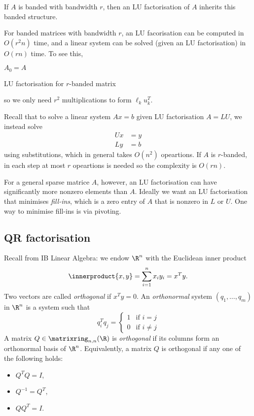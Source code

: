 \documentclass[a4paper]{article}
\newcommand*{\inner}{\innerproduct}
\begin{document}
\begin{application}
  If \(A\) is banded with bandwidth \(r\), then an LU factorisation of \(A\) inherits this banded structure.
\end{application}

For banded matrices with bandwidth \(r\), an LU facorisation can be computed in \(O(r^2n)\) time, and a linear system can be solved (given an LU factorisation) in \(O(rn)\) time. To see this,

\begin{algorithm}
  \(A_0 = A\)\;
  \caption{LU factorisation for \(r\)-banded matrix}
\end{algorithm}
so we only need \(r^2\) multiplications to form \(\ell_ku_k^T\).

Recall that to solve a linear system \(Ax = b\) given LU factorisation \(A = LU\), we instead solve
\begin{align*}
  Ux &= y \\
  Ly &= b
\end{align*}
using substitutions, which in general takes \(O(n^2)\) opeartions. If \(A\) is \(r\)-banded, in each step at most \(r\) opeartions is needed so the complexity is \(O(rn)\).

For a general sparse matrice \(A\), however, an LU factorisation can have significantly more nonzero elements than \(A\). Ideally we want an LU factorisation that minimises \emph{fill-ins}, which is a zero entry of \(A\) that is nonzero in \(L\) or \(U\). One way to minimise fill-ins is via pivoting.

\subsection{QR factorisation}

Recall from IB Linear Algebra: we endow \(\R^n\) with the Euclidean inner product
\[
  \inner{x, y} = \sum_{i = 1}^n x_iy_i = x^Ty.
\]
Two vectors are called \emph{orthogonal} if \(x^Ty = 0\). An \emph{orthonormal} system \((q_1, \dots, q_m)\) in \(\R^n\) is a system such that
\[
  q_i^Tq_j =
  \begin{cases}
    1 & \text{if } i = j \\
    0 & \text{if } i \neq j
  \end{cases}
\]
A matrix \(Q \in \matrixring_{n, n}(\R)\) is \emph{orthogonal} if its columns form an orthonormal basis of \(\R^n\). Equivalently, a matrix \(Q\) is orthogonal if any one of the following holds:
\begin{itemize}
\item \(Q^TQ = I\),
\item \(Q^{-1} = Q^T\),
\item \(QQ^T = I\).
\end{itemize}
\end{document}
